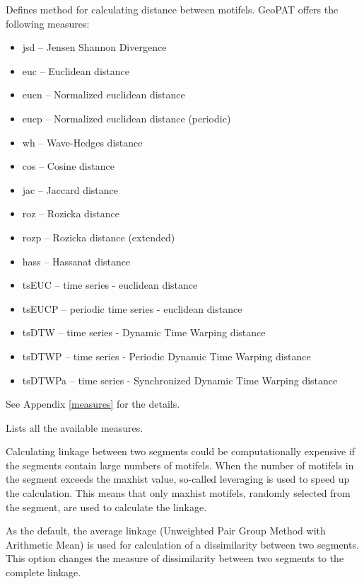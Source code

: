 Defines method for calculating distance between motifels. 
GeoPAT offers the following measures: 
\begin{itemize}
	\item jsd -- Jensen Shannon Divergence
	\item euc -- Euclidean distance
	\item eucn -- Normalized euclidean distance
	\item eucp -- Normalized euclidean distance (periodic)
	\item wh -- Wave-Hedges distance
	\item cos -- Cosine distance
	\item jac -- Jaccard distance
	\item roz -- Rozicka distance
	\item rozp -- Rozicka distance (extended)
	\item hass -- Hassanat distance
	\item tsEUC -- time series - euclidean distance
	\item tsEUCP -- periodic time series - euclidean distance
	\item tsDTW -- time series - Dynamic Time Warping distance
	\item tsDTWP -- time series - Periodic Dynamic Time Warping distance
	\item tsDTWPa -- time series - Synchronized Dynamic Time Warping distance
\end{itemize}
See Appendix \ref{measures} for the details.


Lists all the available measures.


Calculating linkage between two segments could be computationally expensive if the segments contain large numbers of motifels.
When the number of motifels in the segment exceeds the maxhist value, so-called leveraging is used to speed up the calculation.
This means that only maxhist motifels, randomly selected from the segment, are used to calculate the linkage.


As the default, the average linkage (Unweighted Pair Group Method with Arithmetic Mean) is used for calculation of a dissimilarity between two segments. 
This option changes the measure of dissimilarity between two segments to the complete linkage.



